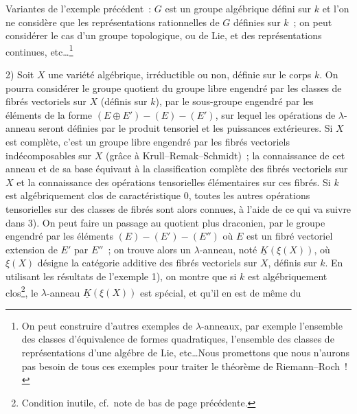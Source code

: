 Variantes de l'exemple précédent~: $G$ est un groupe algébrique défini sur $k$ et l'on ne considère que les représentations rationnelles de $G$ définies sur $k$~; on peut considérer le cas d'un groupe topologique, ou de Lie, et des représentations continues, etc\dots\footnote{On peut construire d'autres exemples de $\lambda$-anneaux, par exemple l'ensemble des classes d'équivalence de formes quadratiques, l'ensemble des classes de représentations d'une algébre de Lie, etc\dots Nous promettons que nous n'aurons pas besoin de tous ces exemples pour traiter le théorème de Riemann--Roch~!}

2) Soit $X$ une variété algébrique, irréductible ou non, définie sur le corps $k$. On pourra considérer le groupe quotient du groupe libre engendré par les classes de fibrés vectoriels sur $X$ (définis sur $k$), par le sous-groupe engendré par les éléments de la forme $(E\oplus E')-(E)-(E')$, sur lequel les opérations de $\lambda$-anneau seront définies par le produit tensoriel et les puissances extérieures. Si $X$ est complète, c'est un groupe libre engendré par les fibrés vectoriels indécomposables sur $X$ (grâce à Krull--Remak--Schmidt)~; la connaissance de cet anneau et de sa base équivaut à la classification complète des fibrés vectoriels sur $X$ et la connaissance des opérations tensorielles élémentaires sur ces fibrés. Si $k$ est algébriquement clos de caractéristique $0$, toutes les autres opérations tensorielles sur des classes de fibrés sont alors connues, à l'aide de ce qui va suivre dans 3). On peut faire un passage au quotient plus draconien, par le groupe engendré par les éléments $(E)-(E')-(E'')$ où $E$ est un fibré vectoriel extension de $E'$ par $E''$~; on trouve alors un $\lambda$-anneau, noté $\underline{K}(\xi(X))$, où $\xi(X)$ désigne la catégorie additive des fibrés vectoriels sur $X$, définis sur $k$. En utilisant les résultats de l'exemple 1), on montre que si $k$ est algébriquement clos\footnote{Condition inutile, cf.\ note de bas de page précédente.}, le $\lambda$-anneau $\underline{K}(\xi(X))$ est spécial, et qu'il en est de même du
